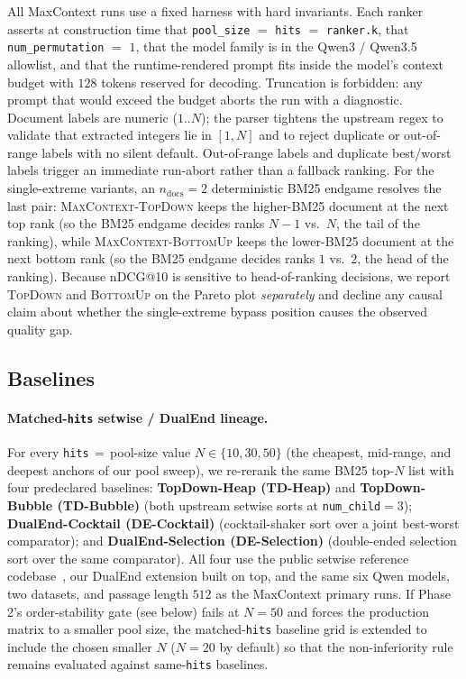 All MaxContext runs use a fixed harness with hard invariants. Each ranker
asserts at construction time that
\texttt{pool\_size} $=$ \texttt{hits} $=$ \texttt{ranker.k}, that
\texttt{num\_permutation} $=$ $1$, that the model family is in the Qwen3 /
Qwen3.5 allowlist, and that the runtime-rendered prompt fits inside the
model's context budget with $128$ tokens reserved for decoding. Truncation
is forbidden: any prompt that would exceed the budget aborts the run with a
diagnostic. Document labels are numeric ($1$..$N$); the parser tightens the
upstream regex to validate that extracted integers lie in $[1, N]$ and to
reject duplicate or out-of-range labels with no silent default. Out-of-range
labels and duplicate best/worst labels trigger an immediate run-abort
rather than a fallback ranking. For the single-extreme variants, an
$n_{\text{docs}}{=}2$ deterministic BM25 endgame resolves the last pair:
\textsc{MaxContext-TopDown} keeps the higher-BM25 document at the next top
rank (so the BM25 endgame decides ranks $N{-}1$ vs.\ $N$, the tail of the
ranking), while \textsc{MaxContext-BottomUp} keeps the lower-BM25 document
at the next bottom rank (so the BM25 endgame decides ranks $1$ vs.\ $2$,
the head of the ranking). Because nDCG@10 is sensitive to head-of-ranking
decisions, we report \textsc{TopDown} and \textsc{BottomUp} on the Pareto
plot \emph{separately} and decline any causal claim about whether the
single-extreme bypass position causes the observed quality gap.

\subsection{Baselines}
\label{ssec:baselines}

\paragraph{Matched-\texttt{hits} setwise / DualEnd lineage.}
For every \texttt{hits}\,$=$\,pool-size value $N \in \{10, 30, 50\}$
(the cheapest, mid-range, and deepest anchors of our pool sweep), we
re-rerank the same BM25 top-$N$ list with four predeclared baselines:
\textbf{TopDown-Heap (TD-Heap)} and \textbf{TopDown-Bubble (TD-Bubble)}
(both upstream setwise sorts at \texttt{num\_child}$=$$3$);
\textbf{DualEnd-Cocktail (DE-Cocktail)} (cocktail-shaker sort over a joint
best-worst comparator); and \textbf{DualEnd-Selection (DE-Selection)}
(double-ended selection sort over the same comparator). All four use the
public setwise reference codebase~\citep{ielab_llmrankers}, our DualEnd
extension built on top, and the same six Qwen models, two datasets, and
passage length $512$ as the MaxContext primary runs. If Phase 2's
order-stability gate (see below) fails at $N{=}50$ and forces the production
matrix to a smaller pool size, the matched-\texttt{hits} baseline grid is
extended to include the chosen smaller $N$ ($N{=}20$ by default) so that the
non-inferiority rule remains evaluated against same-\texttt{hits} baselines.

